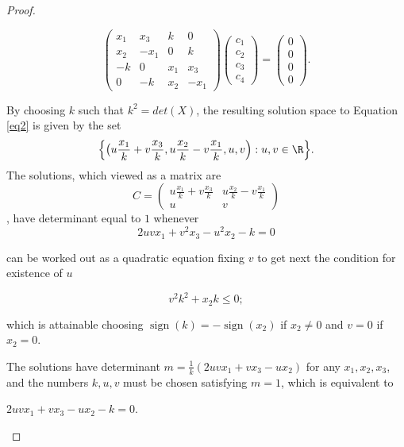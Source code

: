 \documentclass[11pt]{amsart}
\DeclareMathOperator{\sign}{sign} %
\theoremstyle{plain}
\theoremstyle{definition}
\theoremstyle{remark}
\begin{document}
\begin{proof}
\begin{itemize}
\begin{equation}\label{equ2}
\left( \begin{matrix}
x_1 & x_3  & k & 0 \\
x_2 & -x_1  & 0 & k \\
-k & 0  & x_1 & x_3 \\
0 & -k  & x_2 & -x_1 
\end{matrix} \right)
\left( \begin{matrix}
c_1 \\
c_2 \\
c_3 \\
c_4
\end{matrix} \right)=
\left( \begin{matrix}
0 \\
0 \\
0 \\
0
\end{matrix} \right). 
\end{equation}


By choosing $k$ such that $k^2=det(X)$, the resulting solution  space to Equation \ref{eq2} is given by the set 
$$\Bigl\{ \big( u \frac{x_1}{k}+v\frac{x_3}{k},u\frac{x_2}{k}-v\frac{x_1}{k},u,v \Big):u,v \in \R \Bigr\}.$$
The solutions, which viewed as a matrix are $$C = \left( \begin{array}{ccc}
u \frac{x_1}{k}+v\frac{x_3}{k} & u\frac{x_2}{k}-v\frac{x_1}{k} \\ 
u & v \end{array} \right) $$, have determinant equal to $1$ whenever 
\begin{equation}
    2uvx_1 + v^2x_3 - u^2x_2 - k = 0
\end{equation}

can be worked out as a quadratic equation fixing $v$ to get next the condition for existence of $u$

\begin{equation}
    v^2 k^2 + x_2 k \leq 0;
\end{equation}

which is attainable choosing $\sign(k) = - \sign(x_2)$ if $x_2 \neq 0$ and $v = 0$ if $x_2 = 0$.

 The solutions have determinant $m=\frac{1}{k}(2u v x_1 + v x_3-u x_2)$ for any $x_1,x_2,x_3$, and the numbers  $k,u,v$ must be chosen satisfying $m=1$, which is equivalent to 
 
 \smallskip
 
 $2u v x_1 + v x_3-u x_2 -k =0$. 
 
 \smallskip
 

\end{itemize}
\end{proof}
\end{document}
